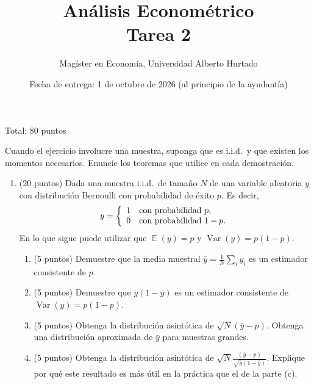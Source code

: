 \documentclass[letterpaper,11pt]{article}
\theoremstyle{plain}
\theoremstyle{definition}
\theoremstyle{remark}
\DeclareMathOperator{\Var}{Var}
\DeclareMathOperator{\E}{\mathbb{E}}
\begin{document}
	
	\title {An\'alisis Econom\'etrico  \\ Tarea 2}
	\author{Mag\'ister en Econom\'ia, Universidad Alberto Hurtado}
	\date{Fecha de entrega: 1 de octubre de 2026 (al principio de la ayudant\'ia)}
\maketitle

Total: 80 puntos

Cuando el ejercicio involucre una muestra, suponga que es i.i.d.\ y que existen los momentos
necesarios. Enuncie los teoremas que utilice en cada demostraci\'on.

\begin{enumerate}
    \item (20 puntos) Dada una muestra i.i.d.\ de tama\~no $N$ de una variable aleatoria $y$ con
        distribuci\'on Bernoulli con probabilidad de \'exito $p$. Es decir,
        \begin{align*}
        y = \left\{
        \begin{array} {l l}
        1 & \text{con probabilidad }p,\\
        0 & \text{con probabilidad }1-p.\\
        \end{array}
        \right.
        \end{align*}
        En lo que sigue puede utilizar que $\E(y) = p$ y $\Var(y)=p(1-p)$.
        \begin{enumerate}
            \item (5 puntos) Demuestre que la media muestral $\bar y=\frac{1}{N}\sum_i y_i$ es un
                estimador consistente de $p$.
            \item (5 puntos) Demuestre que $\bar y (1-\bar y)$ es un estimador consistente de
                $\Var(y)=p(1-p)$.
            \item (5 puntos) Obtenga la distribuci\'on asint\'otica de $\sqrt{N}(\bar y-p)$.
                Obtenga una distribuci\'on aproximada de $\bar y$ para muestras grandes.
            \item (5 puntos) Obtenga la distribuci\'on asint\'otica de
                $\sqrt{N}\frac{(\bar y-p)}{\sqrt{\bar y (1-\bar y)}}$. Explique por qu\'e este
                resultado es m\'as \'util en la pr\'actica que el de la parte (c).
        \end{enumerate}


\end{enumerate}
\end{document}
